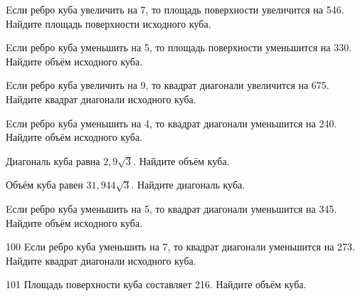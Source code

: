 \begin{taskBN}{93}
Eсли ребро куба увеличить на 7, то площадь поверхности увеличится на 546. Найдите площадь поверхности исходного куба.
\end{taskBN}

\begin{taskBN}{94}
Eсли ребро куба уменьшить на 5, то площадь поверхности уменьшится на 330. Найдите объём исходного куба.
\end{taskBN}

\begin{taskBN}{95}
Eсли ребро куба увеличить на 9, то квадрат диагонали увеличится на 675. Найдите квадрат диагонали исходного куба.
\end{taskBN}

\begin{taskBN}{96}
Eсли ребро куба уменьшить на 4, то квадрат диагонали уменьшится на 240. Найдите объём исходного куба.
\end{taskBN}

\begin{taskBN}{97}
Диагональ куба равна $2,9\sqrt{3}$. Найдите объём куба.
\end{taskBN}

\begin{taskBN}{98}
Объём куба равен $31,944\sqrt{3}$. Найдите диагональ куба.
\end{taskBN}

\begin{taskBN}{99}
Eсли ребро куба уменьшить на 5, то квадрат диагонали уменьшится на 345. Найдите объём исходного куба.
\end{taskBN}

\begin{taskBN}{100}
Eсли ребро куба уменьшить на 7, то квадрат диагонали уменьшится на 273. Найдите квадрат диагонали исходного куба.
\end{taskBN}

\begin{taskBN}{101}
Площадь поверхности куба составляет 216. Найдите объём куба.
\end{taskBN}

